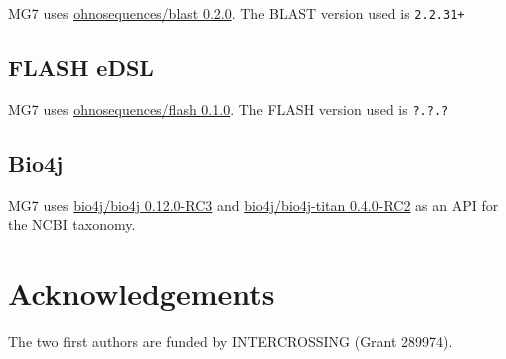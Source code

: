 \documentclass{frontiersSCNS} %
\begin{document}
MG7 uses
\href{https://github.com/ohnosequences/blast/releases/tag/v0.2.0}{ohnosequences/blast
0.2.0}. The BLAST version used is \texttt{2.2.31+}

\subsection{FLASH eDSL}\label{flash-edsl}

MG7 uses
\href{https://github.com/ohnosequences/flash/releases/tag/v0.1.0}{ohnosequences/flash
0.1.0}. The FLASH version used is \texttt{?.?.?}

\subsection{Bio4j}\label{bio4j}

MG7 uses
\href{https://github.com/bio4j/bio4j/releases/tag/v0.12.0-RC3}{bio4j/bio4j
0.12.0-RC3} and
\href{https://github.com/bio4j/bio4j-titan/releases/tag/v0.4.0-RC2}{bio4j/bio4j-titan
0.4.0-RC2} as an API for the NCBI taxonomy.

\section{Acknowledgements}\label{acknowledgements}

The two first authors are funded by INTERCROSSING (Grant 289974).


\end{document}
